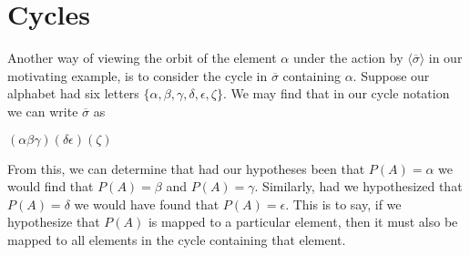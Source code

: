     \section{Cycles}
    Another way of viewing the orbit of the element $\alpha$ under the action by $\langle\overline\sigma\rangle$ in our motivating example, is to consider the cycle in $\overline\sigma$ containing $\alpha$.
    Suppose our alphabet had six letters $\{\alpha, \beta, \gamma, \delta, \epsilon, \zeta\}$. We may find that in our cycle notation we can write $\overline\sigma$ as 
    \begin{center}
        $(\alpha\beta\gamma)(\delta\epsilon)(\zeta)$
    \end{center}
    From this, we can determine that had our hypotheses been that $P(A) = \alpha$ we would find that $P(A) = \beta$ and $P(A) = \gamma$. 
    Similarly, had we hypothesized that $P(A) = \delta$ we would have found that $P(A) = \epsilon$. This is to say, if we hypothesize that $P(A)$ is mapped to a particular
    element, then it must also be mapped to all elements in the cycle containing that element. 

  